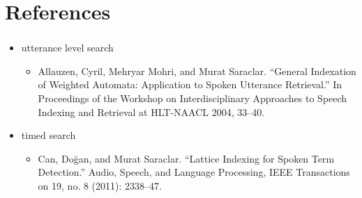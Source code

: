 \documentclass{beamer}
\begin{document}
\section{References}
\frame
{
  \frametitle{\secname}
  
   \begin{itemize}
     \item utterance level search
       \begin{itemize}
       \item Allauzen, Cyril, Mehryar Mohri, and Murat Saraclar. “General Indexation of Weighted Automata: Application to Spoken Utterance Retrieval.” In Proceedings of the Workshop on Interdisciplinary Approaches to Speech Indexing and Retrieval at HLT-NAACL 2004, 33–40.
       \end{itemize}

     \item timed search
       \begin{itemize}
       \item Can, Doğan, and Murat Saraclar. “Lattice Indexing for Spoken Term Detection.” Audio, Speech, and Language Processing, IEEE Transactions on 19, no. 8 (2011): 2338–47.
       \end{itemize}          
  \end{itemize}
}
\end{document}
